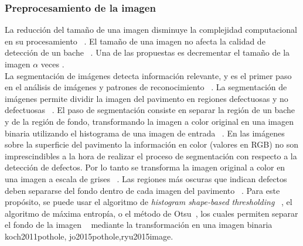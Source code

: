 		\subsubsection{Preprocesamiento de la imagen}
		La reducción del tamaño de una imagen  disminuye la complejidad computacional en su procesamiento ~. 
		El tamaño de una imagen no afecta la calidad de detección de un bache ~. Una de las propuestas 
		es decrementar el tamaño de la imagen $\alpha$ veces . \\
		La segmentación de imágenes detecta información relevante, y es el primer paso en el análisis de imágenes y patrones
		de reconocimiento ~.
		La segmentación de imágenes permite  dividir la imagen del pavimento en regiones defectuosas y no defectuosas ~.
		El paso de segmentación consiste en separar la región de un bache y de la región de fondo, transformando la imagen a color original 
		en una imagen binaria utilizando el histograma de una imagen de entrada ~.
		En las imágenes sobre la superficie del pavimento la información en color (valores en RGB) no son imprescindibles a la hora de realizar 
		el proceso de segmentación con respecto a la detección de defectos. Por lo tanto se  transforma la imagen original a color en una 
		imagen a escala de grises  ~. Las regiones más oscuras que indican defectos deben separarse del fondo 
		dentro de cada imagen del pavimento ~. Para este propósito, se puede usar el algoritmo de \emph{histogram shape-based
		thresholding} ~, el algoritmo de máxima entropía, o el método de Otsu~, 
		los cuales permiten separar el fondo de la imagen ~ mediante la transformación en una imagen binaria \brackcite
		{koch2011pothole, jo2015pothole,ryu2015image}. 

